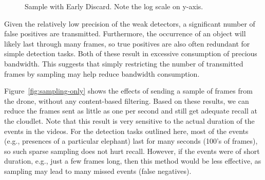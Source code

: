 \begin{figure}

\caption{Sample with Early Discard. Note the log scale on y-axis.}
    \vspace{-0.15in}
\label{fig:sampling-discard}
\end{figure}

Given the relatively low precision of the weak detectors, a significant number 
of false positives are transmitted.  Furthermore, the occurrence of an object will
likely last through many frames, so true positives are also often redundant for 
simple detection tasks.  Both of these result in excessive
consumption of precious bandwidth.  
This suggests that simply restricting the number of transmitted
frames by sampling may help reduce bandwidth consumption.  

Figure~\ref{fig:sampling-only} shows the effects of 
sending a sample of frames from the drone, without any
content-based filtering.  Based on these results, we can reduce
the frames sent as little as one per second and still get
adequate recall at the cloudlet.  Note that this result is very
sensitive to the actual duration of the events in the videos.
For the detection tasks outlined here, most of the events (e.g.,
presences of a particular elephant) last for many seconds (100's
of frames), so such sparse sampling does not hurt recall.
However, if the events were of short duration, e.g., just a few
frames long, then this method would be less effective, as
sampling may lead to many missed events (false negatives).  

